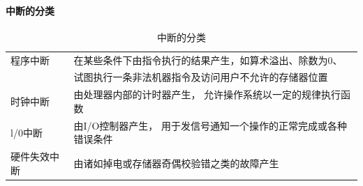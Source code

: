 \documentclass[a4paper, 11pt]{article} %
\begin{document}
\paragraph{中断的分类}  \cite{ostextbook}
\begin{table}[]
  \caption{中断的分类}
  \label{tab:class-int}
  \begin{tabular}{ll}
    \rowcolor[HTML]{FFFFFF} 
    {\color[HTML]{333333} 程序中断}   & {\color[HTML]{333333} 在某些条件下由指令执行的结果产生，如算术溢出、除数为0、} \\
    \rowcolor[HTML]{FFFFFF} 
    {\color[HTML]{333333}}   & {\color[HTML]{333333} 试图执行一条非法机器指令及访问用户不允许的存储器位置} \\
    \rowcolor[HTML]{FFFFFF} 
    {\color[HTML]{333333} 时钟中断}   & {\color[HTML]{333333} 由处理器内部的计时器产生， 允许操作系统以一定的规律执行函数}                           \\
    \rowcolor[HTML]{FFFFFF} 
    {\color[HTML]{333333} l/0中断}  & {\color[HTML]{333333} 由I/O控制器产生， 用于发信号通知一个操作的正常完成或各种错误条件}                       \\
    \rowcolor[HTML]{F8F8F8} 
  {\color[HTML]{333333} 硬件失效中断} & {\color[HTML]{333333} 由诸如掉电或存储器奇偶校验错之类的故障产生}                                   
\end{tabular}
\end{table}
\end{document}
